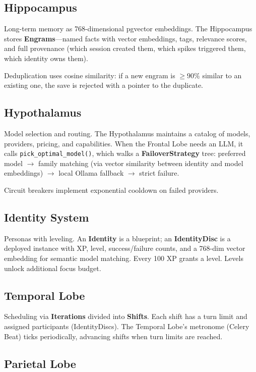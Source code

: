 \documentclass[man,12pt,floatsintext]{apa7}
\begin{document}
\subsection{Hippocampus}

Long-term memory as 768-dimensional pgvector embeddings. The Hippocampus stores
\textbf{Engrams}---named facts with vector embeddings, tags, relevance scores, and
full provenance (which session created them, which spikes triggered them, which identity
owns them).

Deduplication uses cosine similarity: if a new engram is $\geq 90\%$ similar to an
existing one, the save is rejected with a pointer to the duplicate.

\subsection{Hypothalamus}

Model selection and routing. The Hypothalamus maintains a catalog of models, providers,
pricing, and capabilities. When the Frontal Lobe needs an LLM, it calls
\texttt{pick\_optimal\_model()}, which walks a \textbf{FailoverStrategy} tree:
preferred model $\rightarrow$ family matching (via vector similarity between identity
and model embeddings) $\rightarrow$ local Ollama fallback $\rightarrow$ strict failure.

Circuit breakers implement exponential cooldown on failed providers.

\subsection{Identity System}

Personas with leveling. An \textbf{Identity} is a blueprint; an \textbf{IdentityDisc}
is a deployed instance with XP, level, success/failure counts, and a 768-dim vector
embedding for semantic model matching. Every 100 XP grants a level. Levels unlock
additional focus budget.

\subsection{Temporal Lobe}

Scheduling via \textbf{Iterations} divided into \textbf{Shifts}. Each shift has a turn
limit and assigned participants (IdentityDiscs). The Temporal Lobe's metronome
(Celery Beat) ticks periodically, advancing shifts when turn limits are reached.

\subsection{Parietal Lobe}
\end{document}
